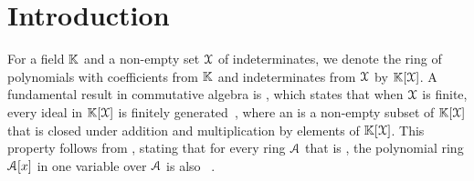 %
%
%
\tableofcontents
%
\section{Introduction}
\label{sec:intro}
%

%
\AP For a field $\mathbb{K}$ and a non-empty set $\mathcal{X}$ of indeterminates, we denote
the ring of polynomials with coefficients from $\mathbb{K}$ and indeterminates from $\mathcal{X}$
by $\mathbb{K}[\mathcal{X}]$. A fundamental result in commutative algebra is
, which states that when $\mathcal{X}$ is finite,
every ideal in $\mathbb{K}[\mathcal{X}]$ is finitely generated~\cite{HILB1890}, where an
 is a non-empty subset of $\mathbb{K}[\mathcal{X}]$ that is closed under
addition and multiplication by elements of $\mathbb{K}[\mathcal{X}]$.
This property follows from 
, stating that for every ring 
$\mathcal{A}$ that is , 
the polynomial ring $\mathcal{A}[x]$ in one variable over $\mathcal{A}$ is also
~\cite[Theorem 4.1]{Lang02}.

